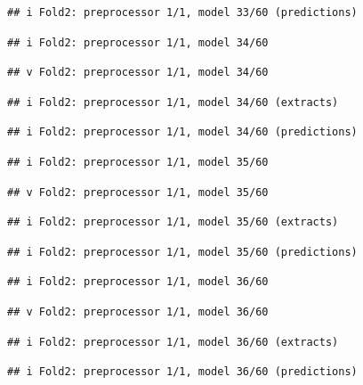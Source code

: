 \documentclass[
]{article}
\begin{document}
\begin{verbatim}
## i Fold2: preprocessor 1/1, model 33/60 (predictions)
\end{verbatim}

\begin{verbatim}
## i Fold2: preprocessor 1/1, model 34/60
\end{verbatim}

\begin{verbatim}
## v Fold2: preprocessor 1/1, model 34/60
\end{verbatim}

\begin{verbatim}
## i Fold2: preprocessor 1/1, model 34/60 (extracts)
\end{verbatim}

\begin{verbatim}
## i Fold2: preprocessor 1/1, model 34/60 (predictions)
\end{verbatim}

\begin{verbatim}
## i Fold2: preprocessor 1/1, model 35/60
\end{verbatim}

\begin{verbatim}
## v Fold2: preprocessor 1/1, model 35/60
\end{verbatim}

\begin{verbatim}
## i Fold2: preprocessor 1/1, model 35/60 (extracts)
\end{verbatim}

\begin{verbatim}
## i Fold2: preprocessor 1/1, model 35/60 (predictions)
\end{verbatim}

\begin{verbatim}
## i Fold2: preprocessor 1/1, model 36/60
\end{verbatim}

\begin{verbatim}
## v Fold2: preprocessor 1/1, model 36/60
\end{verbatim}

\begin{verbatim}
## i Fold2: preprocessor 1/1, model 36/60 (extracts)
\end{verbatim}

\begin{verbatim}
## i Fold2: preprocessor 1/1, model 36/60 (predictions)
\end{verbatim}
\end{document}
